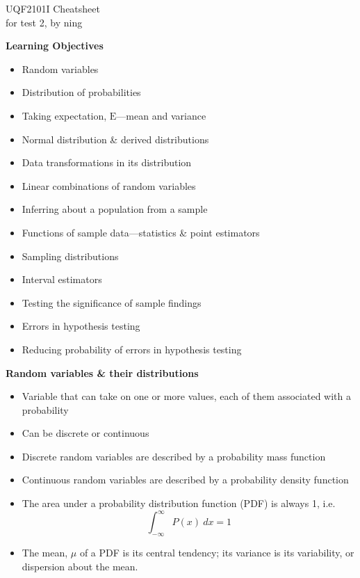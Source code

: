 \documentclass[a4paper]{article}
\newcommand{\heading}[1]{{\small\textbf{#1}}}
\begin{document}
\scriptsize                         %
\setlength\parindent{0pt}           %
\setlength{\abovedisplayskip}{3pt}  %
\setlength{\belowdisplayskip}{3pt}  %

\begin{center}
{\large UQF2101I Cheatsheet}\\{for test 2, by ning}
\end{center}

\begin{multicols*}{4}

\heading{Learning Objectives}
\begin{itemize} \itemsep -0.5em
    \item Random variables
    \item Distribution of probabilities
    \item Taking expectation, $\mathrm{E}$---mean and variance
    \item Normal distribution \& derived distributions
    \item Data transformations in its distribution
    \item Linear combinations of random variables
    \item Inferring about a population from a sample
    \item Functions of sample data---statistics \& point estimators
    \item Sampling distributions
    \item Interval estimators
    \item Testing the significance of sample findings
    \item Errors in hypothesis testing
    \item Reducing probability of errors in hypothesis testing
\end{itemize}

\heading{Random variables \& their distributions}
\begin{itemize} \itemsep -0.5em
    \item Variable that can take on one or more values, each of them
        associated with a probability
    \item Can be discrete or continuous
    \item Discrete random variables are described by a probability mass
        function
    \item Continuous random variables are described by a probability
        density function
    \item The area under a probability distribution function (PDF) is 
        always 1, i.e. $$\int^{\infty}_{-\infty} P(x)\ dx = 1$$
    \item The mean, $\mu$ of a PDF is its central tendency; its variance
        is its variability, or dispersion about the mean.


\end{itemize}
\end{multicols*}
\end{document}
